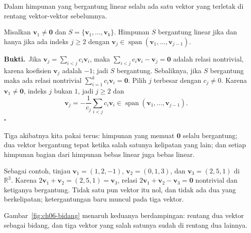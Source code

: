 Dalam himpunan yang bergantung linear selalu ada satu vektor yang terletak di rentang
vektor-vektor sebelumnya.

\begin{lemma}[Ketergantungan]
Misalkan $\mathbf{v}_{1}\neq\mathbf{0}$ dan $S=\{\mathbf{v}_{1},\dots,\mathbf{v}_{k}\}$.
Himpunan $S$ bergantung linear jika dan hanya jika ada indeks $j\ge 2$ dengan
$\mathbf{v}_{j}\in\operatorname{span}(\mathbf{v}_{1},\dots,\mathbf{v}_{j-1})$.
\end{lemma}

\par\medskip\noindent\textbf{Bukti.}\ 
Jika $\mathbf{v}_{j}=\sum_{i<j}c_{i}\mathbf{v}_{i}$, maka
$\sum_{i<j}c_{i}\mathbf{v}_{i}-\mathbf{v}_{j}=\mathbf{0}$ adalah relasi nontrivial, karena
koefisien $\mathbf{v}_{j}$ adalah $-1$; jadi $S$ bergantung. Sebaliknya, jika $S$ bergantung
maka ada relasi nontrivial $\sum_{i=1}^{k}c_{i}\mathbf{v}_{i}=\mathbf{0}$. Pilih $j$ terbesar
dengan $c_{j}\neq 0$. Karena $\mathbf{v}_{1}\neq\mathbf{0}$, indeks $j$ bukan $1$, jadi
$j\ge 2$ dan
\[
  \mathbf{v}_{j}=-\frac{1}{c_{j}}\sum_{i<j}c_{i}\mathbf{v}_{i}
  \in\operatorname{span}(\mathbf{v}_{1},\dots,\mathbf{v}_{j-1}).
\]
\hfill$\square$\par\medskip

Tiga akibatnya kita pakai terus: himpunan yang memuat $\mathbf{0}$ selalu bergantung; dua
vektor bergantung tepat ketika salah satunya kelipatan yang lain; dan setiap himpunan bagian
dari himpunan bebas linear juga bebas linear.

Sebagai contoh, tinjau $\mathbf{v}_{1}=(1,2,-1)$, $\mathbf{v}_{2}=(0,1,3)$, dan
$\mathbf{v}_{3}=(2,5,1)$ di $\mathbb{R}^{3}$. Karena
$2\mathbf{v}_{1}+\mathbf{v}_{2}=(2,5,1)=\mathbf{v}_{3}$, relasi
$2\mathbf{v}_{1}+\mathbf{v}_{2}-\mathbf{v}_{3}=\mathbf{0}$ nontrivial dan ketiganya
bergantung. Tidak satu pun vektor itu nol, dan tidak ada dua yang berkelipatan; ketergantungan
baru muncul pada tiga vektor.

Gambar~\ref{fig:ch06-bidang} menaruh keduanya berdampingan: rentang dua vektor sebagai
bidang, dan tiga vektor yang salah satunya sudah di rentang dua lainnya.

